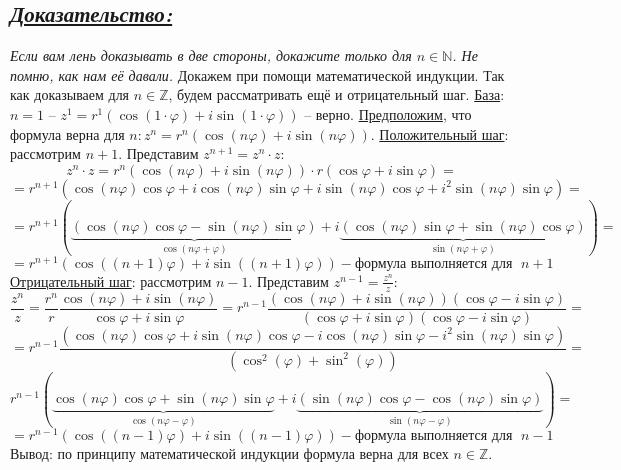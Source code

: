 \documentclass{article}
\begin{document}
\subsection*{\Large \underline{\textit{Доказательство: }}}
\textit{Если вам лень доказывать в две стороны, докажите только для $n \in \mathbb{N}$. Не помню, как нам её давали.}
\newline Докажем при помощи математической индукции. Так как доказываем для $n \in \mathbb{Z}$, будем рассматривать ещё и отрицательный шаг.
\newline \underline{База}: $n = 1$ -- $z^1 = r^1(\cos{(1\cdot\varphi)} + i\sin{(1\cdot\varphi)})$ -- верно.
\newline \underline{Предположим}, что формула верна для $n: z^n =  r^n(\cos{(n\varphi)} + i\sin{(n\varphi)})$.
\newline \underline{Положительный шаг}: рассмотрим $n + 1$. Представим $z^{n + 1} = z^n \cdot z$:
$$ z^n \cdot z =  r^n(\cos{(n\varphi)} + i\sin{(n\varphi)})\cdot r(\cos{\varphi} + i\sin{\varphi}) = $$
$$ = r^{n + 1}(\cos{(n\varphi)}\cos{\varphi} + i\cos{(n\varphi)}\sin{\varphi} + i\sin{(n\varphi)}\cos{\varphi} + i^2\sin{(n\varphi)}\sin{\varphi}) = $$
$$ = r^{n + 1}(\underbrace{(\cos{(n\varphi)}\cos{\varphi} - \sin{(n\varphi)}\sin{\varphi})}_{\cos{(n\varphi + \varphi)}} + i\underbrace{(\cos{(n\varphi)}\sin{\varphi} + \sin{(n\varphi)}\cos{\varphi})}_{\sin{(n\varphi + \varphi)}}) = $$
$$ = r^{n + 1}(\cos{((n + 1)\varphi)} + i\sin{((n+1)\varphi)}) - \mbox{формула выполняется для }\; n+1 $$
\newline \underline{Отрицательный шаг}: рассмотрим $n - 1$. Представим $z^{n - 1} = \frac{z^n}{z}$:
$$ \frac{z^n}{z} = \frac{r^n}{r}\frac{\cos{(n\varphi)} + i\sin{(n\varphi)}}{\cos{\varphi} + i\sin{\varphi}} = r^{n - 1}\frac{(\cos{(n\varphi)} + i\sin{(n\varphi)})(\cos{\varphi} - i\sin{\varphi})}{(\cos{\varphi} + i\sin{\varphi})(\cos{\varphi} - i\sin{\varphi})} = $$
$$ = r^{n - 1}\frac{(\cos{(n\varphi)}\cos{\varphi} + i\sin{(n\varphi)}\cos{\varphi} - i\cos{(n\varphi)}\sin{\varphi} - i^2\sin{(n\varphi)}\sin{\varphi})}{(\cos^2{(\varphi)} + \sin^2{(\varphi)})} = $$
$$ r^{n - 1}(\underbrace{\cos{(n\varphi)}\cos{\varphi} + \sin{(n\varphi)}\sin{\varphi}}_{\cos{(n\varphi - \varphi)}} + i\underbrace{(\sin{(n\varphi)}\cos{\varphi} - \cos{(n\varphi)}\sin{\varphi})}_{\sin{(n\varphi - \varphi)}}) = $$
$$ = r^{n - 1}(\cos{((n - 1)\varphi)} + i\sin{((n - 1)\varphi)}) - \mbox{формула выполняется для }\; n-1 $$
Вывод: по принципу математической индукции формула верна для всех $n \in \mathbb{Z}$.
\end{document}
